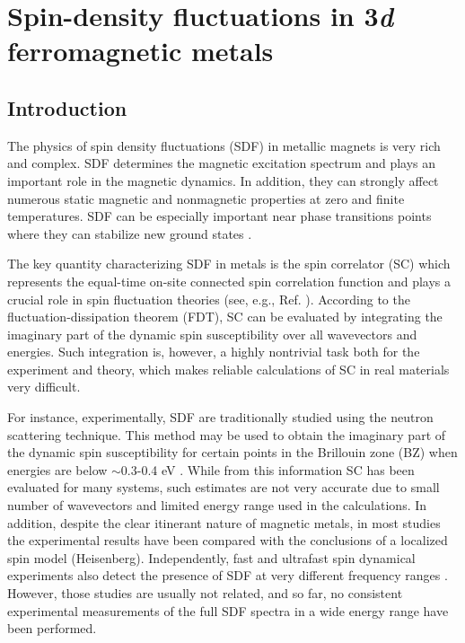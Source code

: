 \chapter{Spin-density fluctuations in 3\emph{d} ferromagnetic metals}
\label{chap:TDDFT}
\section{Introduction}

The physics of spin density fluctuations\cite{MoriyaBook,TakahashiBook} (SDF) in metallic magnets is very rich and complex. SDF determines the magnetic excitation spectrum and plays an important role in the magnetic dynamics. In addition, they can strongly affect numerous static magnetic and nonmagnetic properties at zero and finite temperatures\citep{SolontsovBook,KimBook}. SDF can be especially important near phase transitions points where they can stabilize new ground states \citep{QCPReview}.

The key quantity characterizing SDF in metals is the spin correlator (SC) which represents the equal-time on-site connected spin correlation function and plays a crucial role in spin fluctuation theories (see, e.g., Ref. \citep{TakahashiBook}). According to the fluctuation-dissipation theorem\citep{Kubo} (FDT), SC can be evaluated by integrating the imaginary part of the dynamic spin susceptibility over all wavevectors and energies. Such integration is, however, a highly nontrivial task both for the experiment and theory, which makes reliable calculations of SC in real materials very difficult.

For instance, experimentally, SDF are traditionally studied using the neutron scattering technique. This method may be used to obtain the imaginary part of the dynamic spin susceptibility for certain points in the Brillouin zone (BZ) when energies are below $\sim$0.3-0.4 eV \citep{Dai}. While from this information SC has been evaluated for many systems,\citep{SolontsovBook} such estimates are not very accurate due to small number of wavevectors and limited energy range used in the calculations. In addition, despite the clear itinerant nature of magnetic metals, in most studies the experimental results have been compared with the conclusions of a localized spin model (Heisenberg). Independently, fast and ultrafast spin dynamical experiments also detect the presence of SDF at very different frequency ranges \citep{experiment,ultrafast_Mag}. However, those studies are usually not related, and so far, no consistent experimental measurements of the full SDF spectra in a wide energy range have been performed.  

